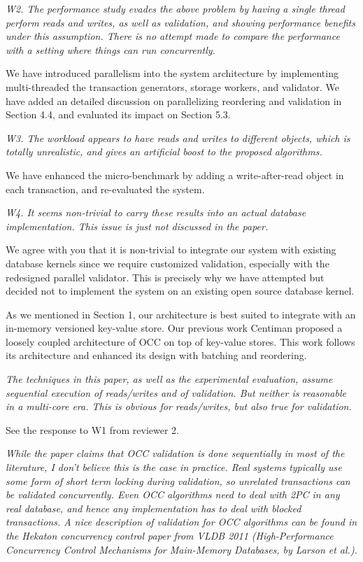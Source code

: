 \documentclass{article}
\begin{document}
\bigskip

\emph{W2. The performance study evades the above problem by having a single thread perform reads and writes, as well as validation, and showing performance benefits under this assumption. There is no attempt made to compare the performance with a setting where things can run concurrently. }

\bigskip
We have introduced parallelism into the system architecture by implementing multi-threaded the transaction generators, storage workers, and validator. We have added an detailed discussion on parallelizing reordering and validation in Section 4.4, and evaluated its impact on Section 5.3.
\bigskip

\emph{W3. The workload appears to have reads and writes to different objects, which is totally unrealistic, and gives an artificial boost to the proposed algorithms.}

\bigskip
We have enhanced the micro-benchmark by adding a write-after-read object in each transaction, and re-evaluated the system.
\bigskip

\emph{W4. It seems non-trivial to carry these results into an actual database implementation. This issue is just not discussed in the paper.}

\bigskip
We agree with you that it is non-trivial to integrate our system with existing database kernels since we require customized validation, especially with the redesigned parallel validator. This is precisely why we have attempted but decided not to implement the system on an existing open source database kernel.

As we mentioned in Section 1, our architecture is best suited to integrate with an in-memory versioned key-value store. Our previous work Centiman proposed a loosely coupled architecture of OCC on top of key-value stores. This work follows its architecture and enhanced its design with batching and reordering.
\bigskip

\emph{The techniques in this paper, as well as the experimental evaluation, assume sequential execution of reads/writes and of validation. But neither is reasonable in a multi-core era. This is obvious for reads/writes, but also true for validation. 
}


\bigskip
See the response to W1 from reviewer 2.
\bigskip

\emph{While the paper claims that OCC validation is done sequentially in most of the literature, I don't believe this is the case in practice. Real systems typically use some form of short term locking during validation, so unrelated transactions can be validated concurrently. Even OCC algorithms need to deal with 2PC in any real database, and hence any implementation has to deal with blocked transactions. A nice description of validation for OCC algorithms can be found in the Hekaton concurrency control paper from VLDB 2011 (High-Performance Concurrency Control Mechanisms for Main-Memory Databases, by Larson et al.). }
\end{document}

